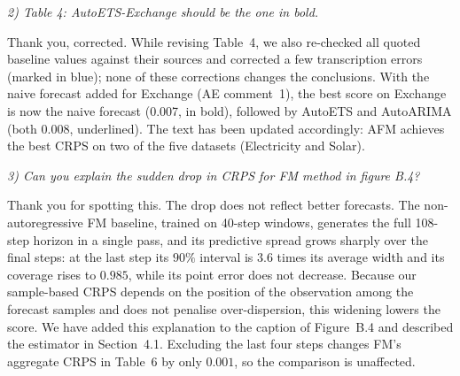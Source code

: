 \documentclass[11pt]{article}
\newcommand{\reviewertext}[1]{%
  \begin{reviewerquote}
    {\color{reviewercolor}\itshape #1}
  \end{reviewerquote}%
}
\newcommand{\authorresponse}[1]{%
    #1\par\medskip
}
\begin{document}
\reviewertext{%
2) Table 4: AutoETS-Exchange should be the one in bold.
}

\authorresponse{%
Thank you, corrected. While revising Table~4, we also re-checked all quoted baseline values against their sources and corrected a few transcription errors (marked in blue); none of these corrections changes the conclusions. With the naive forecast added for Exchange (AE comment~1), the best score on Exchange is now the naive forecast (0.007, in bold), followed by AutoETS and AutoARIMA (both 0.008, underlined). The text has been updated accordingly: AFM achieves the best CRPS on two of the five datasets (Electricity and Solar).
}

\reviewertext{%
3) Can you explain the sudden drop in CRPS for FM method in figure B.4?
}

\authorresponse{%
Thank you for spotting this. The drop does not reflect better forecasts. The non-autoregressive FM baseline, trained on 40-step windows, generates the full 108-step horizon in a single pass, and its predictive spread grows sharply over the final steps: at the last step its $90\%$ interval is $3.6$ times its average width and its coverage rises to $0.985$, while its point error does not decrease. Because our sample-based CRPS depends on the position of the observation among the forecast samples and does not penalise over-dispersion, this widening lowers the score. We have added this explanation to the caption of Figure~B.4 and described the estimator in Section~4.1. Excluding the last four steps changes FM's aggregate CRPS in Table~6 by only $0.001$, so the comparison is unaffected.
}



\end{document}
